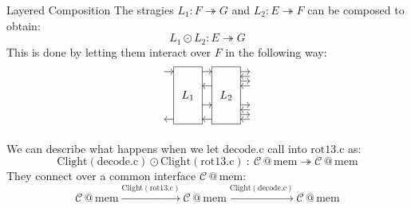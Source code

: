 \documentclass[aspectratio=1610,mathserif]{beamer}
\newcommand{\kw}[1]{\ensuremath{ \mathrm{#1} }}
\begin{document}
\begin{frame}{Layered Composition} %
  The stragies $L_1 : F \twoheadrightarrow G$ and
  $L_2 : E \twoheadrightarrow F$ can be composed to obtain:
  \[
     L_1 \odot L_2 : E \twoheadrightarrow G
  \]
  \pause
  This is done by letting them interact over $F$
  in the following way:
  \[
    \begin{tikzpicture}[yscale=0.15,xscale=0.30]
      \draw (1,-1) rectangle (4,11) node[midway] {$L_1$};
      \draw (5,-1) rectangle (8,11) node[midway] {$L_2$};
      \draw[->] (0,10) -- (1,10);
        \draw[->] (4,10) -- (5,10);
          \draw[->] (8,10) -- (9,10);
          \draw[->] (9,9) -- (8,9);
          \draw[->] (8,8) -- (9,8);
          \draw[->] (9,7) -- (8,7);
        \draw[->] (5,7) -- (4,7);
        \draw[->] (4,3) -- (5,3);
          \draw[->] (8,3) -- (9,3);
          \draw[->] (9,2) -- (8,2);
          \draw[->] (8,1) -- (9,1);
          \draw[->] (9,0) -- (8,0);
        \draw[->] (5,0) -- (4,0);
      \draw[->] (1,0) -- (0,0);
    \end{tikzpicture}
  \]

  \pause
  \begin{example}
    We can describe what happens
    when we let $\kw{decode.c}$ call into $\kw{rot13.c}$ as:
    \[
      \kw{Clight}(\kw{decode.c}) \odot \kw{Clight}(\kw{rot13.c})
      \::\: \mathcal{C} \mathbin@ \kw{mem} \twoheadrightarrow
         \mathcal{C} \mathbin@ \kw{mem}
    \]
    They connect over a common interface $\mathcal{C}\mathbin@\kw{mem}$:
    \[
      \mathcal{C} \mathbin@ \kw{mem}
      \xrightarrow{\kw{Clight}(\kw{rot13.c})}
      \mathcal{C} \mathbin@ \kw{mem}
      \xrightarrow{\kw{Clight}(\kw{decode.c})}
      \mathcal{C} \mathbin@ \kw{mem}
    \]
  \end{example}
\end{frame}
\end{document}

